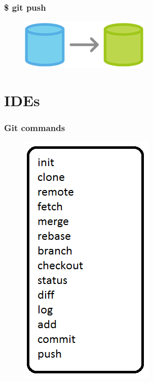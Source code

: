 \documentclass{beamer}
\begin{document}
\begin{frame}
    \frametitle{\$ git push}
    \begin{figure}[h!]
        \begin{center}
            \includegraphics[scale=0.8]{push.png}
        \end{center}
    \end{figure}
\end{frame}

\section{IDEs}

\begin{frame}
    \frametitle{Git commands}
    \begin{figure}[h!]
        \begin{center}
            \includegraphics[scale=0.6]{commands.png}
        \end{center}
    \end{figure}
\end{frame}
\end{document}
